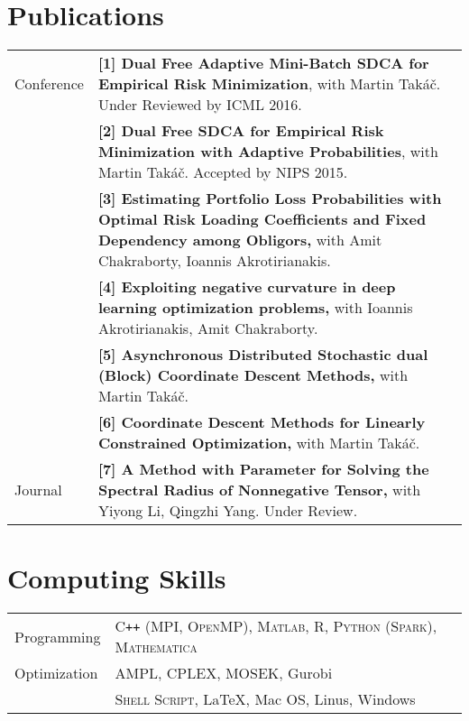 \documentclass[a4paper,11pt]{article} %
\begin{document}
\section{Publications}
\begin{longtable}{>{\centering}p{3.3cm}|p{14cm}}
    Conference &
     \textbf{[1] Dual Free Adaptive Mini-Batch SDCA for Empirical Risk Minimization}, with Martin Takáč. Under Reviewed by ICML 2016.\\
    &\textbf{[2] Dual Free SDCA for Empirical Risk Minimization with Adaptive Probabilities}, with Martin Takáč. Accepted by NIPS 2015.\\
    &\textbf{[3] Estimating Portfolio Loss Probabilities with Optimal Risk Loading Coefficients and Fixed Dependency among Obligors,} with Amit Chakraborty, Ioannis Akrotirianakis. \\
    &\textbf{[4] Exploiting negative curvature in deep learning optimization problems,} with Ioannis Akrotirianakis, Amit Chakraborty.\\
    &\textbf{[5] Asynchronous Distributed Stochastic dual (Block) Coordinate Descent Methods,} with Martin Takáč. \\
    \pagebreak
    &\textbf{[6] Coordinate Descent Methods for Linearly Constrained Optimization,} with Martin Takáč.\\
    Journal &\textbf{[7] A Method with Parameter for Solving the Spectral Radius of Nonnegative Tensor,} with Yiyong Li, Qingzhi Yang. Under Review.
\end{longtable}

\section{Computing Skills}
\begin{longtable}{>{\centering}p{3.3cm}|p{14cm}}
    Programming & \textsc{C\texttt{++} (MPI, OpenMP)}, \textsc{Matlab}, \textsc{R}, \textsc{Python (Spark)}, \textsc{Mathematica}\\
    Optimization & AMPL, CPLEX, MOSEK, Gurobi \\
    {Others} &  \textsc{Shell Script}, \LaTeX, Mac OS, Linus, Windows
\end{longtable}
\end{document}
